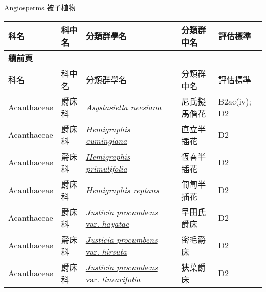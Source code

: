 \noindent\normalfont\selectfont Angiosperms 被子植物
\footnotesize\selectfont
        {\def\arraystretch{1.5}\tabcolsep=2pt
        \begin{longtable}{p{2.5cm}p{2.5cm}p{4.5cm}p{2.5cm}p{3cm}}
        \toprule
          科名 & 科中名 & 分類群學名 & 分類群中名 & 評估標準 \\
        \midrule 
        \endfirsthead

        {{\bfseries 續前頁 }} \\
        科名 & 科中名 & 分類群學名 & 分類群中名 & 評估標準 \\
        \midrule
        \endhead
                Acanthaceae & 爵床科 & \href{http://www.theplantlist.org/tpl1.1/search?q=Asystasiella+neesiana}{\textit{Asystasiella neesiana} } & 尼氏擬馬偕花 & B2ac(iv); D2 \index{Asystasiella@\textit{Asystasiella}!neesiana@\textit{neesiana}}  \index{尼氏擬馬偕花} \\
    Acanthaceae & 爵床科 & \href{http://www.theplantlist.org/tpl1.1/search?q=Hemigraphis+cumingiana}{\textit{Hemigraphis cumingiana} } & 直立半插花 & D2 \index{Hemigraphis@\textit{Hemigraphis}!cumingiana@\textit{cumingiana}}  \index{直立半插花} \\
    Acanthaceae & 爵床科 & \href{http://www.theplantlist.org/tpl1.1/search?q=Hemigraphis+primulifolia}{\textit{Hemigraphis primulifolia} } & 恆春半插花 & D2 \index{Hemigraphis@\textit{Hemigraphis}!primulifolia@\textit{primulifolia}}  \index{恆春半插花} \\
    Acanthaceae & 爵床科 & \href{http://www.theplantlist.org/tpl1.1/search?q=Hemigraphis+reptans}{\textit{Hemigraphis reptans} } & 匍匐半插花 & D2 \index{Hemigraphis@\textit{Hemigraphis}!reptans@\textit{reptans}}  \index{匍匐半插花} \\
    Acanthaceae & 爵床科 & \href{http://www.theplantlist.org/tpl1.1/search?q=Justicia+procumbens+var.+hayatae}{\textit{Justicia procumbens} var. \textit{hayatae} } & 早田氏爵床 & D2 \index{Justicia@\textit{Justicia}!procumbens@\textit{procumbens}!var. hayatae@var. \textit{hayatae}}  \index{早田氏爵床} \\
    Acanthaceae & 爵床科 & \href{http://www.theplantlist.org/tpl1.1/search?q=Justicia+procumbens+var.+hirsuta}{\textit{Justicia procumbens} var. \textit{hirsuta} } & 密毛爵床 & D2 \index{Justicia@\textit{Justicia}!procumbens@\textit{procumbens}!var. hirsuta@var. \textit{hirsuta}}  \index{密毛爵床} \\
    Acanthaceae & 爵床科 & \href{http://www.theplantlist.org/tpl1.1/search?q=Justicia+procumbens+var.+linearifolia}{\textit{Justicia procumbens} var. \textit{linearifolia} } & 狹葉爵床 & D2 \index{Justicia@\textit{Justicia}!procumbens@\textit{procumbens}!var. linearifolia@var. \textit{linearifolia}}  \index{狹葉爵床} \\

\end{longtable}}
